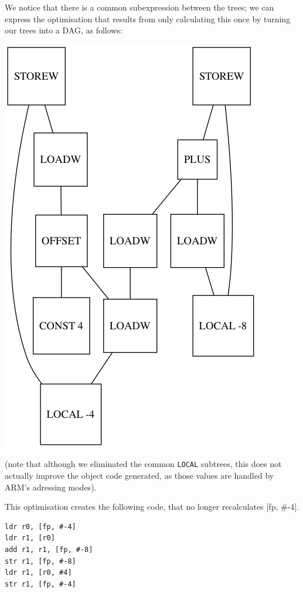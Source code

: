 We notice that there is a common subexpression between the trees; we can express the optimisation that results from only calculating this once by turning our trees into a DAG, as follows:

\includegraphics[width=\textwidth]{ex4.png}

(note that although we eliminated the common \texttt{LOCAL} subtrees, this does not actually improve the object code generated, as those values are handled by ARM's adressing modes).

This optimisation creates the following code, that no longer recalculates [fp, \#-4].

\begin{lstlisting}
ldr r0, [fp, #-4]
ldr r1, [r0]
add r1, r1, [fp, #-8]
str r1, [fp, #-8]
ldr r1, [r0, #4]
str r1, [fp, #-4]
\end{lstlisting}
